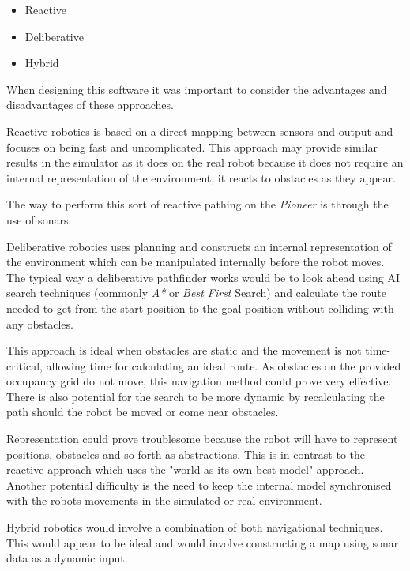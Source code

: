 \documentclass[a4paper,12pt]{article}
\begin{document}
\begin{itemize}
    \item{Reactive}
    \item{Deliberative}
    \item{Hybrid}
\end{itemize}
When designing this software it was important to consider the advantages and disadvantages of these approaches. 

Reactive robotics is based on a direct mapping between sensors and output and focuses on being fast and uncomplicated. This approach may provide similar results in the simulator as it does on the real robot because it does not require an internal representation of the environment, it reacts to obstacles as they appear.

The way to perform this sort of reactive pathing on the \textit{Pioneer} is through the use of sonars.

Deliberative robotics uses planning and constructs an internal representation of the environment which can be manipulated internally before the robot moves. The typical way a deliberative pathfinder works would be to look ahead using AI search techniques (commonly \textit{A*} or \textit{Best First} Search) and calculate the route needed to get from the start position to the goal position without colliding with any obstacles.

This approach is ideal when obstacles are static and the movement is not time-critical, allowing time for calculating an ideal route. As obstacles on the provided occupancy grid do not move, this navigation method could prove very effective. There is also potential for the search to be more dynamic by recalculating the path should the robot be moved or come near obstacles.

Representation could prove troublesome because the robot will have to represent positions, obstacles and so forth as abstractions. This is in contrast to the reactive approach which uses the "world as its own best model" approach. Another potential difficulty is the need to keep the internal model synchronised with the robots movements in the simulated or real environment.

Hybrid robotics would involve a combination of both navigational techniques. This would appear to be ideal and would involve constructing a map using sonar data as a dynamic input.
\end{document}
